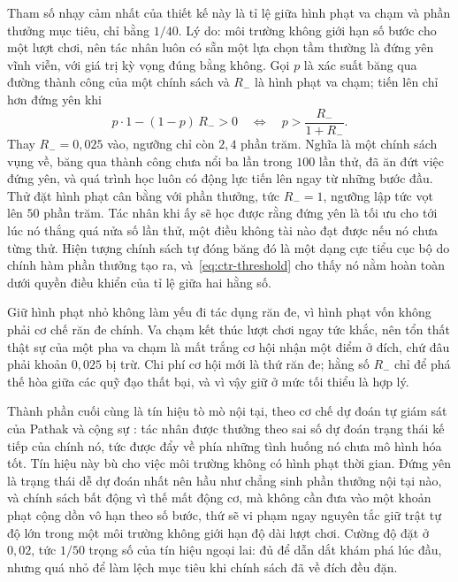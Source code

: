 \indent Tham số nhạy cảm nhất của thiết kế này là tỉ lệ giữa hình phạt va chạm và phần
thưởng mục tiêu, chỉ bằng $1/40$. Lý do: môi trường không giới hạn số bước cho
một lượt chơi, nên tác nhân luôn có sẵn một lựa chọn tầm thường là đứng yên vĩnh viễn, với
giá trị kỳ vọng đúng bằng không. Gọi $p$ là xác suất băng qua đường thành công của một
chính sách và $R_{-}$ là hình phạt va chạm; tiến lên chỉ hơn đứng yên khi
\begin{equation}
p \cdot 1 - (1-p)\,R_{-} > 0
\quad\Longleftrightarrow\quad
p > \frac{R_{-}}{1 + R_{-}} .
\label{eq:ctr-threshold}
\end{equation}
Thay $R_{-} = 0{,}025$ vào, ngưỡng chỉ còn $2{,}4$ phần trăm. Nghĩa là một chính sách vụng
về, băng qua thành công chưa nổi ba lần trong $100$ lần thử, đã ăn đứt việc đứng yên, và quá
trình học luôn có động lực tiến lên ngay từ những bước đầu. Thử đặt hình phạt cân
bằng với phần thưởng, tức $R_{-} = 1$, ngưỡng lập tức vọt lên $50$ phần trăm. Tác nhân
khi ấy sẽ học được rằng đứng yên là tối ưu cho tới lúc nó thắng quá nửa số lần thử, một
điều không tài nào đạt được nếu nó chưa từng thử. Hiện tượng chính sách tự đóng băng đó là
một dạng cực tiểu cục bộ do chính hàm phần thưởng tạo ra,
và~\eqref{eq:ctr-threshold} cho thấy nó nằm hoàn toàn dưới quyền điều khiển của tỉ lệ giữa
hai hằng số.

\indent Giữ hình phạt nhỏ không làm yếu đi tác dụng răn đe, vì hình phạt vốn không phải cơ
chế răn đe chính. Va chạm kết thúc lượt chơi ngay tức khắc, nên tổn thất thật sự của một
pha va chạm là mất trắng cơ hội nhận một điểm ở đích, chứ đâu phải khoản $0{,}025$ bị trừ.
Chi phí cơ hội mới là thứ răn đe; hằng số $R_{-}$ chỉ để phá thế hòa giữa các quỹ đạo thất
bại, và vì vậy giữ ở mức tối thiểu là hợp lý.

\indent Thành phần cuối cùng là tín hiệu tò mò nội tại, theo cơ chế dự đoán tự giám sát
của Pathak và cộng sự \cite{pathak2017curiosity}: tác nhân được thưởng theo sai số dự đoán
trạng thái kế tiếp của chính nó, tức được đẩy về phía những tình huống nó chưa mô hình hóa
tốt. Tín hiệu này bù cho việc môi trường không có hình phạt thời gian. Đứng yên là trạng
thái dễ dự đoán nhất nên hầu như chẳng sinh phần thưởng nội tại nào, và chính sách bất động vì
thế mất động cơ, mà không cần đưa vào một khoản phạt cộng dồn vô hạn theo số
bước, thứ sẽ vi phạm ngay nguyên tắc giữ trật tự độ lớn trong một môi trường không giới
hạn độ dài lượt chơi. Cường độ đặt ở $0{,}02$, tức $1/50$ trọng số của tín hiệu
ngoại lai: đủ để dẫn dắt khám phá lúc đầu, nhưng quá nhỏ để làm lệch mục tiêu khi chính
sách đã về đích đều đặn.

